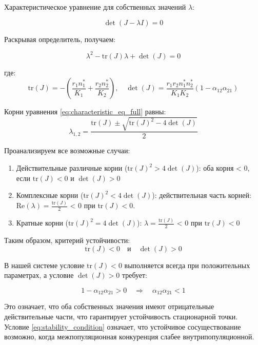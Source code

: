 \documentclass[a4paper, 14pt]{extarticle}
\begin{document}
Характеристическое уравнение для собственных значений \(\lambda\):

\[
\det(J - \lambda I) = 0
\]

Раскрывая определитель, получаем:

\begin{equation}
\lambda^2 - \text{tr}(J)\lambda + \det(J) = 0
\label{eq:characteristic_eq_full}
\end{equation}

где:
\[
\text{tr}(J) = -\left(\dfrac{r_1 n_1^*}{K_1} + \dfrac{r_2 n_2^*}{K_2}\right), \quad
\det(J) = \dfrac{r_1 r_2 n_1^* n_2^*}{K_1 K_2}(1 - \alpha_{12} \alpha_{21})
\label{eq:trace_det}
\]

Корни уравнения \eqref{eq:characteristic_eq_full} равны:
\[
\lambda_{1,2} = \frac{\text{tr}(J) \pm \sqrt{\text{tr}(J)^2 - 4\det(J)}}{2}
\]

Проанализируем все возможные случаи:

\begin{enumerate}
\item Действительные различные корни (\(\text{tr}(J)^2 > 4\det(J)\)): оба корня < 0, если \(\text{tr}(J) < 0\) и \(\det(J) > 0\)

\item Комплексные корни (\(\text{tr}(J)^2 < 4\det(J)\)): действительная часть корней: \(\text{Re}(\lambda) = \frac{\text{tr}(J)}{2}\) < 0 при \(\text{tr}(J) < 0\).

\item Кратные корни (\(\text{tr}(J)^2 = 4\det(J)\)): \(\lambda = \frac{\text{tr}(J)}{2}\) < 0 при \(\text{tr}(J) < 0\)
\end{enumerate}

Таким образом, критерий устойчивости: 
\[
\text{tr}(J) < 0 \quad \text{и} \quad \det(J) > 0
\]

В нашей системе условие \(\text{tr}(J) < 0\) выполняется всегда при положительных параметрах, а условие \(\det(J) > 0\) требует:

\begin{equation}
1 - \alpha_{12} \alpha_{21} > 0 \quad \Rightarrow \quad \alpha_{12} \alpha_{21} < 1
\label{eq:stability_condition}
\end{equation}

Это означает, что оба собственных значения имеют отрицательные действительные части, что гарантирует устойчивость стационарной точки. Условие \eqref{eq:stability_condition} означает, что устойчивое сосуществование возможно, когда межпопуляционная конкуренция слабее внутрипопуляционной.
\end{document}
